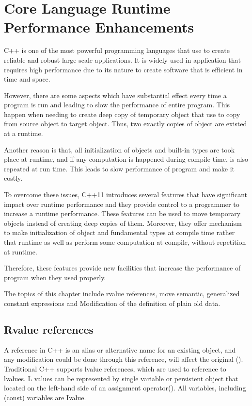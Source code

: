 \documentclass[11pt]{report}
\begin{document}
\chapter{Core Language Runtime Performance Enhancements}
\label{chapter: Runtime Performance Enhancements}
C++ is one of the most powerful programming languages that use to create reliable and robust large scale applications. It is widely used in application that requires high performance due to its nature to create software that is efficient in time and space.

However, there are some aspects which have substantial effect every time a program is run and leading to slow the performance of entire program. This happen when needing to create deep copy of temporary object that use to copy from source object to target object. Thus, two exactly copies of object are existed at a runtime.

Another reason is that, all initialization of objects and built-in types are took place at runtime, and if any computation is happened during compile-time, is also repeated at run time. This leads to slow performance of program and make it costly.

To overcome these issues, C++11 introduces several features that have significant impact over runtime performance and they provide control to a programmer to increase a runtime performance.  These features can be used to move temporary objects instead of creating deep copies of them. Moreover, they offer mechanism to make initialization of object and fundamental types at compile time rather that runtime as well as perform some computation at compile, without repetition at runtime.

Therefore, these features provide new facilities that increase the performance of program when they used properly. 

The topics of this chapter include rvalue references, move semantic, generalized constant expressions and Modification of the definition of plain old data.


\section{Rvalue references}
\label{section: Rvalue references}
A reference in C++ is an alias or alternative name for an existing object, and any modification could be done through this reference, will affect the original (\cite{Gregorie:professionalcpp}). Traditional C++ supports lvalue references, which are used to reference to lvalues. L values can be represented by single variable or persistent object that located on the left-hand side of an assignment operator(\cite{Gregorie:professionalcpp}). All variables, including (const) variables are Ivalue.
\end{document}
